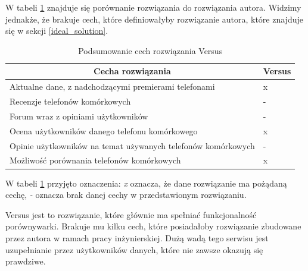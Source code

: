 W tabeli \ref{comparison_versus} znajduje się porównanie rozwiązania do rozwiązania autora. Widzimy jednakże, że brakuje cech, które definiowałyby rozwiązanie autora, które znajduje się w sekcji \ref{ideal_solution}.
\begin{table}[H]
    \centering
    \begin{tabular}{|l|l|}
        \hline
        \multicolumn{1}{|c|}{Cecha rozwiązania} & \multicolumn{1}{c|}{Versus} \\ \hline
        Aktualne dane, z nadchodzącymi premierami telefonami & x \\ \hline
        Recenzje telefonów komórkowych & - \\ \hline
        Forum wraz z opiniami użytkowników & - \\ \hline
        Ocena użytkowników danego telefonu komórkowego & x \\ \hline
        Opinie użytkowników na temat używanych telefonów komórkowych & - \\ \hline
        Możliwość porównania telefonów komórkowych & x \\ \hline
    \end{tabular}
    \caption{Podsumowanie cech rozwiązania Versus}
    \label{comparison_versus}
\end{table}
W tabeli \ref{comparison_versus} przyjęto oznaczenia: \textit{x} oznacza, że dane rozwiązanie ma pożądaną cechę, \textit{-} oznacza brak danej cechy w przedstawionym rozwiązaniu.

Versus jest to rozwiązanie, które głównie ma spełniać funkcjonalność porównywarki. Brakuje mu kilku cech, które posiadałoby rozwiązanie zbudowane przez autora w ramach pracy inżynierskiej. Dużą wadą tego serwisu jest uzupełnianie przez użytkowników danych, które nie zawsze okazują się prawdziwe.
